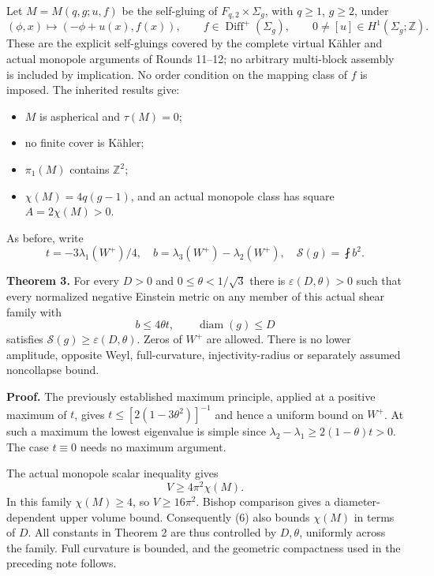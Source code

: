 \documentclass[
  11pt,
]{article}
\providecommand{\tightlist}{%
  \setlength{\itemsep}{0pt}\setlength{\parskip}{0pt}}
\begin{document}
Let \(M=M(q,g;u,f)\) be the self-gluing of \(F_{q,2}\times\Sigma_g\),
with \(q\ge1\), \(g\ge2\), under \[
 (\phi,x)\longmapsto(-\phi+u(x),f(x)),
 \qquad f\in\operatorname{Diff}^+(\Sigma_g),\qquad
 0\ne[u]\in H^1(\Sigma_g;\mathbb Z).
\] These are the explicit self-gluings covered by the complete virtual
Kähler and actual monopole arguments of Rounds 11--12; no arbitrary
multi-block assembly is included by implication. No order condition on
the mapping class of \(f\) is imposed. The inherited results give:

\begin{itemize}
\tightlist
\item
  \(M\) is aspherical and \(\tau(M)=0\);
\item
  no finite cover is Kähler;
\item
  \(\pi_1(M)\) contains \(\mathbb Z^2\);
\item
  \(\chi(M)=4q(g-1)\), and an actual monopole class has square
  \(A=2\chi(M)>0\).
\end{itemize}

As before, write \[
 t=-3\lambda_1(W^+)/4,\quad b=\lambda_3(W^+)-\lambda_2(W^+),
 \quad\mathscr S(g)=\fint b^2.
\]

\textbf{Theorem 3.} For every \(D>0\) and \(0\le\theta<1/\sqrt3\) there
is \(\varepsilon(D,\theta)>0\) such that every normalized negative
Einstein metric on any member of this actual shear family with \[
                  b\le4\theta t,
                  \qquad\operatorname{diam}(g)\le D         \tag{5}
\] satisfies \(\mathscr S(g)\ge\varepsilon(D,\theta)\). Zeros of \(W^+\)
are allowed. There is no lower amplitude, opposite Weyl, full-curvature,
injectivity-radius or separately assumed noncollapse bound.

\textbf{Proof.} The previously established maximum principle, applied at
a positive maximum of \(t\), gives \(t\le[2(1-3\theta^2)]^{-1}\) and
hence a uniform bound on \(W^+\). At such a maximum the lowest
eigenvalue is simple since \(\lambda_2-\lambda_1\ge2(1-\theta)t>0\). The
case \(t\equiv0\) needs no maximum argument.

The actual monopole scalar inequality gives \[
                       V\ge4\pi^2\chi(M).                  \tag{6}
\] In this family \(\chi(M)\ge4\), so \(V\ge16\pi^2\). Bishop comparison
gives a diameter-dependent upper volume bound. Consequently (6) also
bounds \(\chi(M)\) in terms of \(D\). All constants in Theorem 2 are
thus controlled by \(D,\theta\), uniformly across the family. Full
curvature is bounded, and the geometric compactness used in the
preceding note follows.
\end{document}
